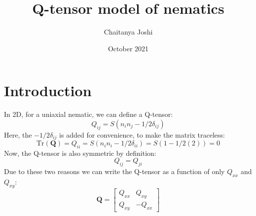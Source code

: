 \documentclass{article}
\title{Q-tensor model of nematics}
\author{Chaitanya Joshi}
\date{October 2021}
\begin{document}
\maketitle

\section{Introduction}
In 2D, for a uniaxial nematic, we can define a Q-tensor:
\[
Q_{ij} = S (n_i n_j - 1/2 \delta_{ij})
\]
Here, the $-1/2 \delta_{ij}$ is added for convenience, to make the matrix traceless: 
\[\text{Tr}(\mathbf{Q}) = Q_{ii} = S(n_i n_i - 1/2 \delta_{ii}) = S(1 - 1/2(2)) = 0
\]
Now, the Q-tensor is also symmetric by definition:
\[
Q_{ij} = Q_{ji}
\]
Due to these two reasons we can write the Q-tensor as a function of only $Q_{xx}$ and $Q_{xy}$:
\[
\mathbf{Q} = \begin{bmatrix}Q_{xx} & Q_{xy} \\ Q_{xy} & -Q_{xx} \end{bmatrix}
\]
\end{document}
